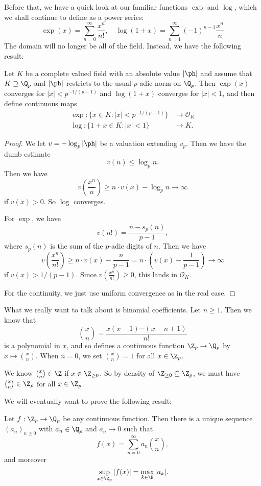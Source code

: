 \documentclass[a4paper]{article}
\begin{document}
Before that, we have a quick look at our familiar functions $\exp$ and $\log$, which we shall continue to define as a power series:
\[
  \exp(x) = \sum_{n = 0}^\infty \frac{x^n}{n!},\quad \log(1 + x) = \sum_{n = 1}^\infty (-1)^{n - 1}\frac{x^n}{n}
\]
The domain will no longer be all of the field. Instead, we have the following result:
\begin{prop}
  Let $K$ be a complete valued field with an absolute value $|\ph|$ and assume that $K \supseteq \Q_p$ and $|\ph|$ restricts to the usual $p$-adic norm on $\Q_p$. Then $\exp(x)$ converges for $|x| < p^{-1/(p - 1)}$ and $\log(1 + x)$ converges for $|x| < 1$, and then define continuous maps
  \begin{align*}
    \exp: \{x \in K: |x| < p^{-1/(p - 1)}\} &\to \mathcal{O}_K\\
    \log: \{1 + x \in K: |x| < 1 \} &\to K.
  \end{align*}
\end{prop}

\begin{proof}
  We let $v = -\log_p |\ph|$ be a valuation extending $v_p$. Then we have the dumb estimate
  \[
    v(n) \leq \log_p n.
  \]
  Then we have
  \[
    v\left(\frac{x^n}{n}\right) \geq n \cdot v(x) - \log_p n \to \infty
  \]
  if $v(x) > 0$. So $\log$ converges.

  For $\exp$, we have
  \[
    v(n!) = \frac{n - s_p(n)}{p - 1},
  \]
  where $s_p(n)$ is the sum of the $p$-adic digits of $n$. Then we have
  \[
    v\left(\frac{x^n}{n!}\right) \geq n\cdot v(x) - \frac{n}{p - 1} = n\cdot\left(v(x) - \frac{1}{p - 1}\right)\to \infty
  \]
  if $v(x) > 1/(p - 1)$. Since $v\left(\frac{x^n}{n!}\right) \geq 0$, this lands in $\mathcal{O}_K$.

  For the continuity, we just use uniform convergence as in the real case.
\end{proof}

What we really want to talk about is binomial coefficients. Let $n \geq 1$. Then we know that
\[
  \binom{x}{n} = \frac{x(x - 1) \cdots (x - n + 1)}{n!}
\]
is a polynomial in $x$, and so defines a continuous function $\Z_p \to \Q_p$ by $x \mapsto \binom{x}{n}$. When $n = 0$, we set $\binom{x}{n} = 1$ for all $x \in \Z_p$.

We know $\binom{x}{n} \in \Z$ if $x \in \Z_{\geq 0}$. So by density of $\Z_{\geq 0} \subseteq \Z_p$, we must have $\binom{x}{n} \in \Z_p$ for all $x \in \Z_p$.

We will eventually want to prove the following result:
\begin{thm}
  Let $f: \Z_p \to \Q_p$ be any continuous function. Then there is a unique sequence $(a_n)_{n \geq 0}$ with $a_n \in \Q_p$ and $a_n \to 0$ such that
  \[
    f(x) = \sum_{n = 0}^\infty a_n \binom{x}{n},
  \]
  and moreover
  \[
    \sup_{x \in \Z_p}|f(x)| = \max_{k \in \N} |a_k|.
  \]
\end{thm}
\end{document}

